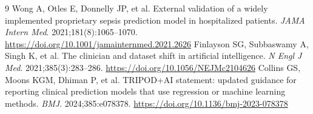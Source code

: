 \documentclass[11pt]{article}
\begin{document}
\begin{thebibliography}{9}
 Wong A, Otles E, Donnelly JP, et al. External validation of a widely implemented proprietary sepsis prediction model in hospitalized patients. \textit{JAMA Intern Med}. 2021;181(8):1065--1070. \url{https://doi.org/10.1001/jamainternmed.2021.2626}
 Finlayson SG, Subbaswamy A, Singh K, et al. The clinician and dataset shift in artificial intelligence. \textit{N Engl J Med}. 2021;385(3):283--286. \url{https://doi.org/10.1056/NEJMc2104626}
 Collins GS, Moons KGM, Dhiman P, et al. TRIPOD+AI statement: updated guidance for reporting clinical prediction models that use regression or machine learning methods. \textit{BMJ}. 2024;385:e078378. \url{https://doi.org/10.1136/bmj-2023-078378}
\end{thebibliography}
\end{document}
